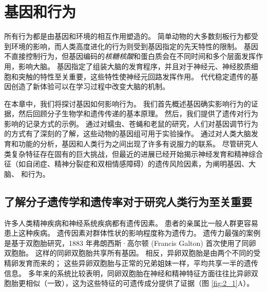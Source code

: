 \chapter{基因和行为} \label{chap:chap2}
所有行为都是由基因和环境的相互作用塑造的。 
简单动物的大多数刻板行为都受到环境的影响，而人类高度进化的行为则受到基因指定的先天特性的限制。 
基因不直接控制行为，但基因编码的\textit{核糖核酸}和蛋白质会在不同时间和多个层面发挥作用，影响大脑。 
基因指定了组装大脑的发育程序，并且对于神经元、神经胶质细胞和突触的特性至关重要，这些特性使神经元回路发挥作用。 
代代稳定遗传的基因创造了新体验可以在学习过程中改变大脑的机制。


在本章中，我们将探讨基因如何影响行为。 
我们首先概述基因确实影响行为的证据，然后回顾分子生物学和遗传传递的基本原理。 
然后，我们提供了遗传对行为影响的记录方式的示例。
通过对蠕虫、苍蝇和老鼠的研究，人们对基因调节行为的方式有了深刻的了解，这些动物的基因组可用于实验操作。 
通过对人类大脑发育和功能的分析，基因和人类行为之间出现了许多有说服力的联系。 
尽管研究人类复杂特征存在固有的巨大挑战，但最近的进展已经开始揭示神经发育和精神综合征（如自闭症、精神分裂症和双相情感障碍）的遗传风险因素，为阐明基因、大脑、 和行为。


\section{了解分子遗传学和遗传率对于研究人类行为至关重要}

许多人类精神疾病和神经系统疾病都有遗传因素。 
患者的亲属比一般人群更容易患上这种疾病。 
遗传因素对群体性状的影响程度称为遗传力。 
遗传力最强的案例是基于双胞胎研究，1883 年弗朗西斯·高尔顿 (Francis Galton) 首次使用了同卵双胞胎。 这样的同卵双胞胎共享所有基因。 
相反，异卵双胞胎是由两个不同的受精卵发育而来的； 这些异卵双胞胎与正常的兄弟姐妹一样，平均共享一半的遗传信息。 
多年来的系统比较表明，同卵双胞胎在神经和精神特征方面往往比异卵双胞胎更相似（一致），这为这些特征的可遗传成分提供了证据（图 \ref{fig:2_1}A）。

